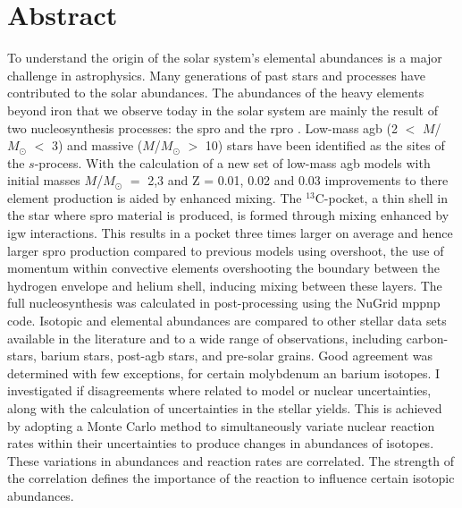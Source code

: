 \chapter{Abstract}

To understand the origin of the solar system's elemental abundances is a major challenge in astrophysics. Many generations of past stars and processes have contributed to the solar abundances. The abundances of the heavy elements beyond iron that we observe today in the solar system are mainly the result of two nucleosynthesis processes: the \acrfull{spro} and the \acrfull{rpro} . Low-mass \acrfull{agb} (2 $<$ $M$/$M_\odot$ $<$ 3) and massive ($M$/$M_\odot$ $>$ 10) stars have been identified as the sites of the $s$-process. With the calculation of a new set of low-mass \acrshort{agb} models with initial masses $M$/$M_\odot$ $=$ 2,3 and Z = 0.01, 0.02 and 0.03 improvements to there element production is aided by enhanced mixing. The $^{13}$C-pocket, a thin shell in the star where \acrshort{spro} material is produced, is formed through mixing enhanced by \acrfull{igw} interactions. This results in a pocket three times larger on average and hence larger \acrshort{spro} production compared to previous models using overshoot, the use of momentum within convective elements overshooting the boundary between the hydrogen envelope and helium shell, inducing mixing between these layers. The full nucleosynthesis was calculated in post-processing using the NuGrid mppnp code. Isotopic and elemental abundances are compared to other stellar data sets available in the literature and to a wide range of observations, including carbon-stars, barium stars, post-\acrshort{agb} stars, and pre-solar grains. Good agreement was determined with few exceptions, for certain molybdenum an barium isotopes. I investigated if disagreements where related to model or nuclear uncertainties, along with the calculation of uncertainties in the stellar yields. This is achieved by adopting a Monte Carlo method to simultaneously variate nuclear reaction rates within their uncertainties to produce changes in abundances of isotopes. These variations in abundances and reaction rates are correlated. The strength of the correlation defines the importance of the reaction to influence certain isotopic abundances. 